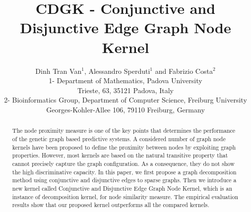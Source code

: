 \documentclass{esannV2}
\begin{document}
\title{CDGK - Conjunctive and Disjunctive Edge Graph Node Kernel}

\author{Dinh Tran Van$^1$, Alessandro Sperduti$^1$ and Fabrizio Costa$^2$
%
%
\vspace{.3cm}\\
%
1- Department of Mathematics, Padova University\\
Trieste, 63, 35121 Padova, Italy
%
\vspace{.1cm}\\
2- Bioinformatics Group, Department of Computer Science, Freiburg University \\
Georges-Kohler-Allee 106, 79110 Freiburg, Germany\\
}

\maketitle

\begin{abstract}\noindent The node proximity measure is one of the key points that determines the performance of the genetic graph based predictive systems. A considered number of graph node kernels have been proposed to define the proximity between nodes by exploiting graph properties. However, most kernels are based on the natural transitive property that cannot precisely capture the graph configuration. As a consequence, they do not show the high discriminative capacity. In this paper, we first propose a graph decomposition method using conjunctive and disjunctive edges to sparse graphs. Then we introduce a new kernel called Conjunctive and Disjunctive Edge Graph Node Kernel, which is an instance of decomposition kernel, for node similarity measure. The empirical evaluation results show that our proposed kernel outperforms all the compared kernels.
\end{abstract}
\end{document}
